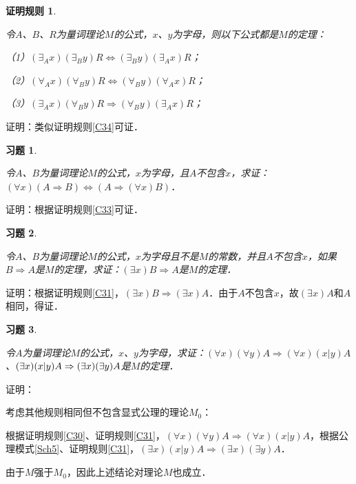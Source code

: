 \documentclass[12pt, a4paper, oneside]{book}
\newtheorem{C}{证明规则}
\newtheorem{exer}{习题}
\begin{document}
			\begin{C}\label{C42}
				\hfill\par			
				令$A$、$B$、$R$为量词理论$M$的公式，$x$、$y$为字母，则以下公式都是$M$的定理：
				\par
				（1）$(\exists_Ax)(\exists_By)R\Leftrightarrow (\exists_By)(\exists_Ax)R$；
				\par
				（2）$(\forall_Ax)(\forall_By)R\Leftrightarrow (\forall_By)(\forall_Ax)R$；
				\par
				（3）$(\exists_Ax)(\forall_By)R\Rightarrow (\forall_By)(\exists_Ax)R$；	
			\end{C}
			证明：类似证明规则\ref{C34}可证．			

			\begin{exer}\label{exer13}
				\hfill\par
				令$A$、$B$为量词理论$M$的公式，$x$为字母，且$A$不包含$x$，求证：$(\forall x)(A\Rightarrow B)\Leftrightarrow (A\Rightarrow (\forall x)B)$．				
			\end{exer}
			证明：根据证明规则\ref{C33}可证．
			
			\begin{exer}\label{exer14}
				\hfill\par
				令$A$、$B$为量词理论$M$的公式，$x$为字母且不是$M$的常数，并且$A$不包含$x$，如果$B\Rightarrow A$是$M$的定理，求证：$(\exists x)B\Rightarrow A$是$M$的定理．
			\end{exer}
			证明：根据证明规则\ref{C31}，$(\exists x)B\Rightarrow (\exists x)A$．由于$A$不包含$x$，故$(\exists x)A$和$A$相同，得证．

			\begin{exer}\label{exer15}
				\hfill\par
				令$A$为量词理论$M$的公式，$x$、$y$为字母，求证：$(\forall x)(\forall y)A\Rightarrow (\forall x)(x|y)A$、$(\exists x)(x|y)A\\\Rightarrow (\exists x)(\exists y)A$是$M$的定理．
			\end{exer}
			证明：
			\par
			考虑其他规则相同但不包含显式公理的理论$M_0$：
			\par
			根据证明规则\ref{C30}、证明规则\ref{C31}，$(\forall x)(\forall y)A\Rightarrow (\forall x)(x|y)A$，根据公理模式\ref{Sch5}、证明规则\ref{C31}，$(\exists x)(x|y)A\Rightarrow (\exists x)(\exists y)A$．
			\par
			由于$M$强于$M_0$，因此上述结论对理论$M$也成立．
\end{document}
